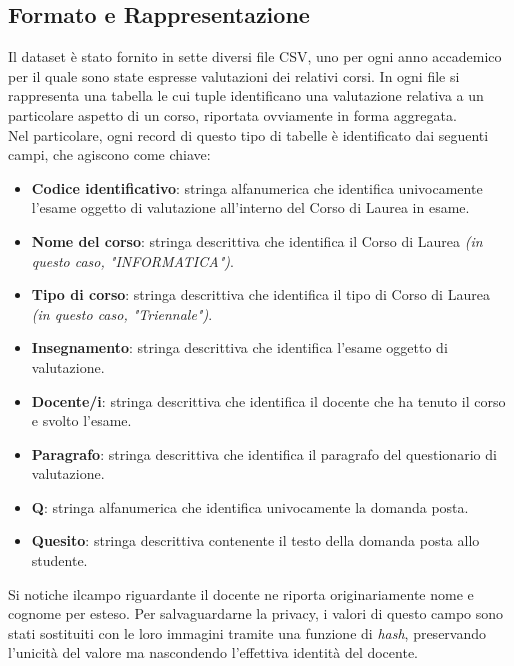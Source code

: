 \subsection{Formato e Rappresentazione}

Il dataset è stato fornito in sette diversi file CSV, uno per ogni anno accademico per il quale sono state espresse valutazioni dei relativi corsi. In ogni file si rappresenta una tabella le cui tuple identificano una valutazione relativa a un particolare aspetto di un corso, riportata ovviamente in forma aggregata. \\

\noindent Nel particolare, ogni record di questo tipo di tabelle è identificato dai seguenti campi, che agiscono come chiave:

\begin{itemize}
	\item \textbf{Codice identificativo}: stringa alfanumerica che identifica univocamente l'esame oggetto di valutazione all'interno del Corso di Laurea in esame.
	\item \textbf{Nome del corso}: stringa descrittiva che identifica il Corso di Laurea \textit{(in questo caso, "INFORMATICA")}.
	\item \textbf{Tipo di corso}: stringa descrittiva che identifica il tipo di Corso di Laurea \textit{(in questo caso, "Triennale")}.
	\item \textbf{Insegnamento}: stringa descrittiva che identifica l'esame oggetto di valutazione.
	\item \textbf{Docente/i}: stringa descrittiva che identifica il docente che ha tenuto il corso e svolto l'esame.
	\item \textbf{Paragrafo}: stringa descrittiva che identifica il paragrafo del questionario di valutazione.
	\item \textbf{Q}: stringa alfanumerica che identifica univocamente la domanda posta.
	\item \textbf{Quesito}: stringa descrittiva contenente il testo della domanda posta allo studente.
\end{itemize}

\noindent  Si notiche ilcampo riguardante il docente ne riporta originariamente nome e cognome per esteso. Per salvaguardarne la privacy, i valori di questo campo sono stati sostituiti con le loro immagini tramite una funzione di \textit{hash}, preservando l'unicità del valore ma nascondendo l'effettiva identità del docente. \\

